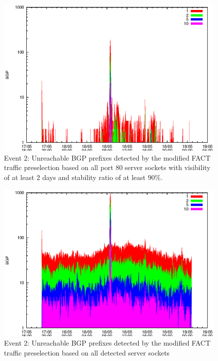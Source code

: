 \begin{figure}
	[p] \centering 
	\includegraphics[width=0.75\linewidth]{images/events/2010_05_18/bgp_log_port80_Set_stab_9_vts_2.eps}
	\caption{Event 2: Unreachable BGP prefixes detected by the modified FACT traffic preselection based on all port 80 server sockets with visibility of at least 2 days and stability ratio of at least $90\%$.} 
	\label{fig:TIER1_FACT_allSES80VTS2STAB9} 
\end{figure}

\begin{figure}
	[ht] \centering 
	\includegraphics[width=0.75\linewidth]{images/events/2010_05_18/bgp_log_all_external.eps}
	\caption{Event 2: Unreachable BGP prefixes detected by the modified FACT traffic preselection based on all detected server sockets} 
	\label{fig:TIER1_FACT_allSES} 
\end{figure}


